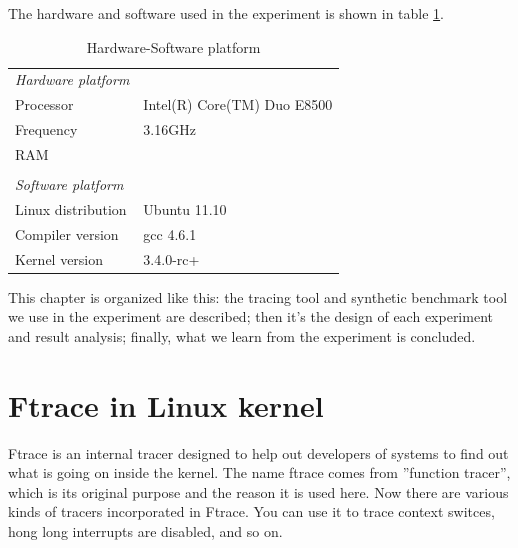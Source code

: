 The hardware and software used in the experiment is shown in 
table \ref{tab:exp_setup}.
\begin{table}[H]%
  \centering
  \begin{tabular}{ll}\hline
	\emph{Hardware platform}\hspace{4cm}		& 	\\
	Processor			& Intel(R) Core(TM) Duo E8500	 \\
	Frequency			& 3.16GHz\\
	RAM				& 	  \\	
					&	\\	
	\emph{Software platform}\hspace{4cm}		& 	\\
	Linux distribution		& Ubuntu 11.10\\
	Compiler version		& gcc 4.6.1\\
	Kernel version			& 3.4.0-rc+ \\\hline
  \end{tabular}
  \caption{Hardware-Software platform}
  \label{tab:exp_setup}
\end{table}
This chapter is organized like this: the tracing tool and synthetic benchmark
tool we use in the experiment are described; then it's the design of each 
experiment and result analysis; finally, what we learn from the experiment
is concluded.

\section{Ftrace in Linux kernel}
Ftrace\cite{ftrace} is an internal tracer designed to help out developers of systems to
find out what is going on inside the kernel. The name ftrace comes from
''function tracer'', which is its original purpose and the reason it is 
used here. Now there are various kinds of tracers incorporated in Ftrace.
You can use it to trace context switces, hong long interrupts are disabled,
and so on.

